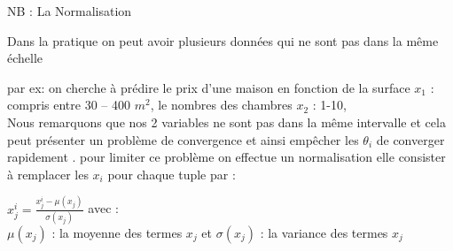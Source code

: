   
  NB :  La Normalisation
  
  Dans la pratique on peut avoir plusieurs données qui ne sont pas dans la même échelle
  
  par ex: on cherche à prédire le prix d'une maison en fonction de la surface ${x}_{1}$ : compris entre 30 -- 400 ${m}^2$, le nombres des chambres ${x}_{2}$ : 1-10,\\
    Nous remarquons que nos 2 variables ne sont pas dans la même intervalle et  cela peut présenter un problème de convergence et ainsi empêcher les ${\theta }_{i}$ de converger rapidement .
   pour limiter ce problème on effectue un normalisation elle consister à remplacer les ${x}_{i}$ pour chaque tuple par :
   
        ${x}_{j}^{i} =  \frac{{x}_{j}^{i}- {\mu({x}_{j})}}{{\sigma({x}_{j})}}$
        avec : \\
        ${\mu({x}_{j})}$ : la moyenne des termes  ${x}_{j}$ et 
        ${\sigma({x}_{j})}$ : la variance des termes  ${x}_{j}$ 
        